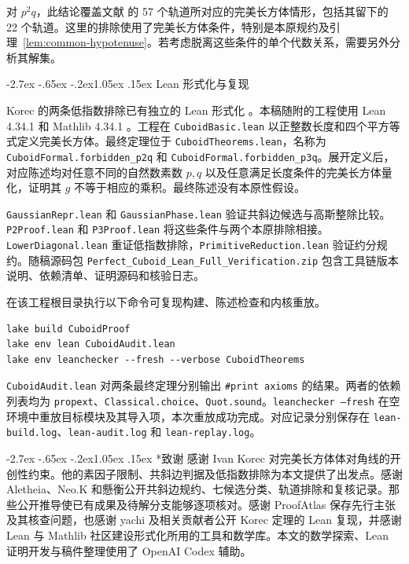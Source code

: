 \documentclass[11pt,a4paper,twoside]{article}
\makeatletter
\numberwithin{equation}{section}
\renewcommand{\section}{\@startsection{section}{1}{\z@}%
  {-2.7ex \@plus -.65ex \@minus -.2ex}{1.05ex \@plus .15ex}%
  {\normalfont\large\bfseries}}
\makeatother
\begin{document}
对 \(p^2q\)，此结论覆盖文献 \cite{ref2} 的 57 个轨道所对应的完美长方体情形，包括其留下的 22 个轨道。这里的排除使用了完美长方体条件，特别是本原规约及引理~\ref{lem:common-hypotenuse}。若考虑脱离这些条件的单个代数关系，需要另外分析其解集。

\section{Lean 形式化与复现}
\label{sec:lean}

Korec 的两条低指数排除已有独立的 Lean 形式化 \cite{ref5}。本稿随附的工程使用 Lean 4.34.1 \cite{ref6} 和 Mathlib 4.34.1 \cite{ref7}。工程在 \texttt{CuboidBasic.\allowbreak{}lean} 以正整数长度和四个平方等式定义完美长方体。最终定理位于 \texttt{CuboidTheorems.\allowbreak{}lean}，名称为 \texttt{CuboidFormal.\allowbreak{}forbidden\_\allowbreak{}p2q} 和 \texttt{CuboidFormal.\allowbreak{}forbidden\_\allowbreak{}p3q}。展开定义后，对应陈述均对任意不同的自然数素数 \(p,q\) 以及任意满足长度条件的完美长方体量化，证明其 \(g\) 不等于相应的乘积。最终陈述没有本原性假设。

\texttt{GaussianRepr.\allowbreak{}lean} 和 \texttt{GaussianPhase.\allowbreak{}lean} 验证共斜边候选与高斯整除比较。\texttt{P2Proof.\allowbreak{}lean} 和 \texttt{P3Proof.\allowbreak{}lean} 将这些条件与两个本原排除相接。\texttt{LowerDiagonal.\allowbreak{}lean} 重证低指数排除，\texttt{PrimitiveReduction.\allowbreak{}lean} 验证约分规约。随稿源码包 \texttt{Perfect\_\allowbreak{}Cuboid\_\allowbreak{}Lean\_\allowbreak{}Full\_\allowbreak{}Verification.\allowbreak{}zip} 包含工具链版本说明、依赖清单、证明源码和核验日志。

在该工程根目录执行以下命令可复现构建、陈述检查和内核重放。

\begin{verbatim}
lake build CuboidProof
lake env lean CuboidAudit.lean
lake env leanchecker --fresh --verbose CuboidTheorems
\end{verbatim}
\texttt{CuboidAudit.\allowbreak{}lean} 对两条最终定理分别输出 \texttt{\#print axioms} 的结果。两者的依赖列表均为 \texttt{propext}、\texttt{Classical.\allowbreak{}choice}、\texttt{Quot.\allowbreak{}sound}。\texttt{leanchecker --fresh} 在空环境中重放目标模块及其导入项，本次重放成功完成。对应记录分别保存在 \texttt{lean-build.\allowbreak{}log}、\texttt{lean-audit.\allowbreak{}log} 和 \texttt{lean-replay.\allowbreak{}log}。

\section*{致谢}
感谢 Ivan Korec 对完美长方体体对角线的开创性约束。他的素因子限制、共斜边判据及低指数排除为本文提供了出发点。感谢 Aletheia、Neo.K 和懸衡公开共斜边规约、七候选分类、轨道排除和复核记录。那些公开推导使已有成果及待解分支能够逐项核对。感谢 ProofAtlas 保存先行主张及其核查问题，也感谢 yachi 及相关贡献者公开 Korec 定理的 Lean 复现，并感谢 Lean 与 Mathlib 社区建设形式化所用的工具和数学库。本文的数学探索、Lean 证明开发与稿件整理使用了 OpenAI Codex 辅助。
\end{document}
